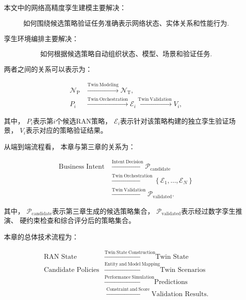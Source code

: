 \documentclass[lang=cn,12pt]{elegantbook}
\begin{document}
本文中的网络高精度孪生建模主要解决：

\begin{equation}
\text{如何围绕候选策略验证任务准确表示网络状态、实体关系和性能行为}.
\end{equation}

孪生环境编排主要解决：

\begin{equation}
\text{如何根据候选策略自动组织状态、模型、场景和验证任务}.
\end{equation}

两者之间的关系可以表示为：

\begin{equation}
\begin{aligned}
\mathcal{N}_{\mathrm{P}}
&\xrightarrow{\mathrm{Twin\ Modeling}}
\mathcal{N}_{\mathrm{T}},
\\
P_i
&\xrightarrow{\mathrm{Twin\ Orchestration}}
\mathcal{E}_i
\xrightarrow{\mathrm{Twin\ Validation}}
V_i,
\end{aligned}
\label{eq:modeling_orchestration_validation_relation}
\end{equation}

其中，
$P_i$表示第$i$个候选RAN策略，
$\mathcal{E}_i$表示针对该策略构建的独立孪生验证场景，
$V_i$表示对应的策略验证结果。

从端到端流程看，
本章与第三章的关系为：

\begin{equation}
\begin{aligned}
\text{Business Intent}
&\xrightarrow{\mathrm{Intent\ Decision}}
\mathcal{P}_{\mathrm{candidate}}
\\
&\xrightarrow{\mathrm{Twin\ Orchestration}}
\left\{
\mathcal{E}_1,
\ldots,
\mathcal{E}_N
\right\}
\\
&\xrightarrow{\mathrm{Twin\ Validation}}
\mathcal{P}_{\mathrm{validated}}.
\end{aligned}
\label{eq:intent_to_twin_validation_flow}
\end{equation}

其中，
$\mathcal{P}_{\mathrm{candidate}}$表示第三章生成的候选策略集合，
$\mathcal{P}_{\mathrm{validated}}$表示经过数字孪生推演、
硬约束检查和综合评分后的策略集合。

本章的总体技术流程为：

\begin{equation}
\begin{aligned}
\text{RAN State}
&\xrightarrow{\mathrm{Twin\ State\ Construction}}
\text{Twin State}
\\
\text{Candidate Policies}
&\xrightarrow{\mathrm{Entity\ and\ Model\ Mapping}}
\text{Twin Scenarios}
\\
&\xrightarrow{\mathrm{Performance\ Simulation}}
\text{Predictions}
\\
&\xrightarrow{\mathrm{Constraint\ and\ Score}}
\text{Validation Results}.
\end{aligned}
\label{eq:chapter_four_overall_flow}
\end{equation}
\end{document}
